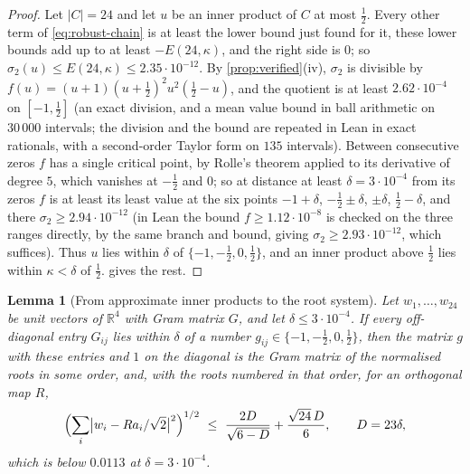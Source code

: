 \documentclass[11pt,reqno]{amsart}
\renewcommand{\_}{\origunderscore\allowbreak}
\numberwithin{equation}{section}
\theoremstyle{plain}
\newtheorem{lem}[thm]{Lemma}
\theoremstyle{definition}
\theoremstyle{remark}
\begin{document}
\begin{proof}
Let $|C|=24$ and let $u$ be an inner product of $C$ at most $\tfrac12$.
Every other term of \eqref{eq:robust-chain} is at least the lower bound
just found for it, these lower bounds add up to at least $-E(24,\kappa)$,
and the right side is $0$; so
$\sigma_2(u)\le E(24,\kappa)\le2.35\cdot10^{-12}$. By
\cref{prop:verified}(iv), $\sigma_2$ is divisible by
$f(u)=(u+1)(u+\tfrac12)^2u^2(\tfrac12-u)$, and the quotient is at least
$2.62\cdot10^{-4}$ on $[-1,\tfrac12]$ (an exact division, and a mean value
bound in ball arithmetic on $30\,000$ intervals; the division and the bound
are repeated in Lean in exact rationals, with a second-order Taylor form on
$135$ intervals). Between consecutive
zeros $f$ has a single critical point, by Rolle's theorem applied to its
derivative of degree $5$, which vanishes at $-\tfrac12$ and $0$; so at
distance at least $\delta=3\cdot10^{-4}$ from its zeros $f$ is at least its
least value at the six points $-1+\delta$, $-\tfrac12\pm\delta$, $\pm\delta$,
$\tfrac12-\delta$, and there $\sigma_2\ge2.94\cdot10^{-12}$ (in Lean the
bound $f\ge1.12\cdot10^{-8}$ is checked on the three ranges directly, by the
same branch and bound, giving $\sigma_2\ge2.93\cdot10^{-12}$, which
suffices). Thus $u$ lies
within $\delta$ of $\{-1,-\tfrac12,0,\tfrac12\}$, and an inner product above
$\tfrac12$ lies within $\kappa<\delta$ of $\tfrac12$.
 gives the rest.
\end{proof}

\begin{lem}[From approximate inner products to the root
system]\label{lem:root-lattice-robust}
Let $w_1,\dots,w_{24}$ be unit vectors of $\mathbb R^4$ with Gram matrix
$G$, and let $\delta\le3\cdot10^{-4}$. If every off-diagonal entry
$G_{ij}$ lies within $\delta$ of a number $g_{ij}\in\{-1,-\tfrac12,0,\tfrac12\}$,
then the matrix $g$ with these entries and $1$ on the diagonal is the
Gram matrix of the normalised roots in some order, and, with the roots
numbered in that order, for an orthogonal map $R$,
\[
  \Bigl(\sum_i\bigl|w_i-Ra_i/\sqrt2\bigr|^2\Bigr)^{1/2}
  \ \le\ \frac{2D}{\sqrt{6-D}}+\frac{\sqrt{24}\,D}{6},\qquad D=23\delta ,
\]
which is below $0.0113$ at $\delta=3\cdot10^{-4}$.
\end{lem}
\end{document}
